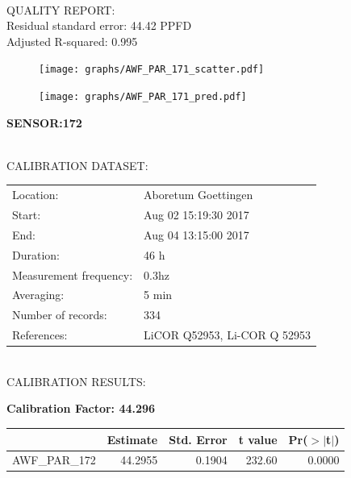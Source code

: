 \documentclass[oneside]{report}
\begin{document}
\hrulefill\\
QUALITY REPORT:\\
Residual standard error: 44.42 PPFD\\
Adjusted R-squared: 0.995



\begin{figure}[H]
  \centering
  \texttt{[image: graphs/AWF\_PAR\_171\_scatter.pdf]}
\end{figure}




\begin{figure}[H]
  \centering
  \texttt{[image: graphs/AWF\_PAR\_171\_pred.pdf]}
\end{figure}

\pagebreak


\begin{center}
\large{\textbf{SENSOR:172}}\\
\end{center}

\hrulefill\\
CALIBRATION DATASET:\\
\begin{table}[h!]
  \centering
  \label{tab:table1}
  \begin{tabular}{ll}
    Location: & Aboretum Goettingen\\ 
    
    
    Start:  & Aug 02 15:19:30 2017 \\
    End:   & Aug 04 13:15:00 2017\\ 
    Duration: & 46 h\\
    Measurement frequency: & 0.3hz\\
    Averaging:  &5 min\\
    Number of records: & 334 \\
    References: & LiCOR Q52953, Li-COR Q 52953 \\
  \end{tabular}
\end{table}

\hrulefill\\
CALIBRATION RESULTS:\\


\begin{center}
\textbf{\large{Calibration Factor: 44.296}}\\
\end{center}
\begin{table}[ht]
\centering
\begin{tabular}{rrrrr}
  \hline
 & Estimate & Std. Error & t value & Pr($>$$|$t$|$) \\ 
  \hline
AWF\_PAR\_172 & 44.2955 & 0.1904 & 232.60 & 0.0000 \\ 
   \hline
\end{tabular}
\end{table}
\end{document}

